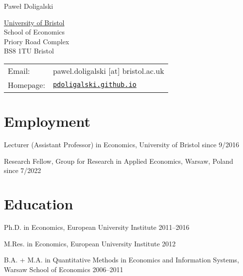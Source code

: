 \documentclass[letterpaper]{article}
\def\name{Pawe\l{} Doligalski}
\renewenvironment{itemize}{
  \begin{list}{}{
    \setlength{\leftmargin}{1.5em}
  }
}{
  \end{list}
}
\begin{document}
{\huge \name}


\vspace{0.25in}

\begin{minipage}{0.45\linewidth}
  \href{http://www.unc.edu/}{University of Bristol} \\
  School of Economics \\
  Priory Road Complex \\
  BS8 1TU Bristol
\end{minipage}
\begin{minipage}{0.45\linewidth}
  \begin{tabular}{ll}
    Email: & pawel.doligalski [at] bristol.ac.uk \\
    Homepage: & \href{http://pdoligalski.github.io}{\tt pdoligalski.github.io} \\
  \end{tabular}
\end{minipage}

\section*{Employment}

\begin{itemize}
\item Lecturer (Assistant Professor) in Economics, University of Bristol \hfill since 9/2016

\item Research Fellow, Group for Research in Applied Economics, Warsaw, Poland \hfill since 7/2022

\end{itemize}


\section*{Education}

\begin{itemize}
  \item Ph.D. in Economics, European University Institute \hfill 2011--2016

  \item M.Res. in Economics, European University Institute \hfill 2012

  \item{B.A. + M.A. in Quantitative Methods in Economics and Information Systems,\\
   \indent \hspace{8cm} Warsaw School of Economics \hfill 2006--2011}


\end{itemize}
\end{document}
